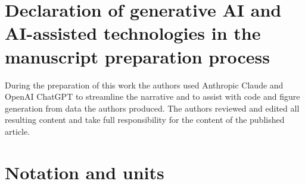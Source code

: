 \documentclass[a4paper]{article}
\newif\ifjne
\newif\ifsupp
\newif\ifappendices
\begin{document}
\section*{Declaration of generative AI and AI-assisted technologies in the manuscript
preparation process}
During the preparation of this work the authors used Anthropic Claude and OpenAI ChatGPT to
streamline the narrative and to assist with code and figure generation from data the authors
produced. The authors reviewed and edited all resulting content and take full responsibility
for the content of the published article.




\fi
\ifsupp\clearpage\else\ifjne\else\clearpage\fi\fi
\appendix
\ifsupp
\section*{Notation and units}\phantomsection\label{app:notation-supp}
\def\notationtablelabel{tab:notation-supp}

\else
\section{Notation and units}\label{app:notation}
\def\notationtablelabel{tab:notation}

\renewcommand{\theequation}{B\arabic{equation}}
\renewcommand{\theHequation}{appendixB.\arabic{equation}}
\setcounter{equation}{0}
\clearpage

\fi

\makeatletter
\let\ne@stdsection\section
\renewcommand{\section}{\clearpage\ne@stdsection}
\makeatother
\ifappendices
\renewcommand{\thesection}{S\arabic{section}}
\renewcommand{\theHsection}{supp.\arabic{section}}
\setcounter{section}{0}
\renewcommand{\theequation}{S\arabic{equation}}
\renewcommand{\theHequation}{supp.\arabic{equation}}
\setcounter{equation}{0}
\renewcommand{\thefigure}{S\arabic{figure}}
\renewcommand{\theHfigure}{supp.\arabic{figure}}
\setcounter{figure}{0}
\renewcommand{\thetable}{S\arabic{table}}
\renewcommand{\theHtable}{supp.\arabic{table}}
\setcounter{table}{0}







\ifsupp
\clearpage


\fi
\fi
\end{document}
